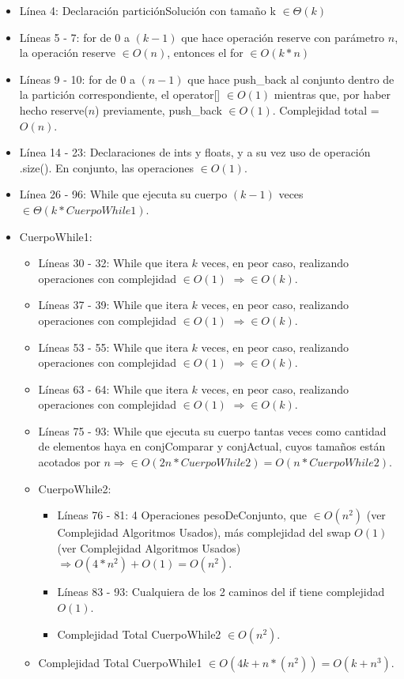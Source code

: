 \begin{itemize}
\item Línea 4: Declaración particiónSolución con tamaño k $\in \Theta(k)$
\item Líneas 5 - 7: for de $0$ a $(k-1)$ que hace operación reserve con parámetro $n$, la operación reserve $\in O(n)$, entonces el for $\in O(k*n)$
\item Líneas 9 - 10: for de $0$ a $(n-1)$ que hace push\_back al conjunto dentro de la partición correspondiente, el operator[] $\in O(1)$ mientras que, por haber hecho reserve($n$) previamente, push\_back $\in O(1)$. Complejidad total = $O(n)$.
\item Línea 14 - 23: Declaraciones de ints y floats, y a su vez uso de operación .size(). En conjunto, las operaciones $\in O(1)$.
\item Línea 26 - 96: While que ejecuta su cuerpo $(k-1)$ veces $\in \Theta(k*CuerpoWhile1)$.
\item CuerpoWhile1:
\begin{itemize}
\item Líneas 30 - 32: While que itera $k$ veces, en peor caso, realizando operaciones con complejidad $\in O(1)$ $\Rightarrow \in O(k)$.
\item Líneas 37 - 39: While que itera $k$ veces, en peor caso, realizando operaciones con complejidad $\in O(1)$ $\Rightarrow \in O(k)$.
\item Líneas 53 - 55: While que itera $k$ veces, en peor caso, realizando operaciones con complejidad $\in O(1)$ $\Rightarrow \in O(k)$.
\item Líneas 63 - 64: While que itera $k$ veces, en peor caso, realizando operaciones con complejidad $\in O(1)$ $\Rightarrow \in O(k)$.
\item Líneas 75 - 93: While que ejecuta su cuerpo tantas veces como cantidad de elementos haya en conjComparar y conjActual, cuyos tamaños están acotados por $n \Rightarrow \in O(2n*CuerpoWhile2) = O(n*CuerpoWhile2)$.
\item CuerpoWhile2:
\begin{itemize}
\item Líneas 76 - 81: 4 Operaciones pesoDeConjunto, que $\in O(n^2)$ (ver Complejidad Algoritmos Usados), más complejidad del swap $O(1)$ (ver Complejidad Algoritmos Usados) $\Rightarrow O(4*n^2) + O(1) = O(n^2)$.
\item Líneas 83 - 93: Cualquiera de los 2 caminos del if tiene complejidad $O(1)$.
\item Complejidad Total CuerpoWhile2 $\in O(n^2)$.
\end{itemize}
\item Complejidad Total CuerpoWhile1 $\in O(4k + n*(n^2)) = O(k + n^3)$.
\end{itemize}
\end{itemize}

